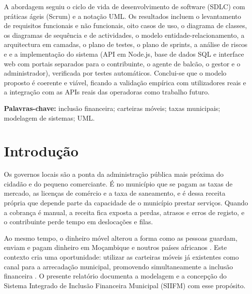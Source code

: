 \documentclass[12pt,a4paper,openany]{report}
\begin{document}
A abordagem seguiu o ciclo de vida de desenvolvimento de software (SDLC) com práticas ágeis (Scrum) e a notação UML. Os resultados incluem o levantamento de requisitos funcionais e não funcionais, oito casos de uso, o diagrama de classes, os diagramas de sequência e de actividades, o modelo entidade-relacionamento, a arquitectura em camadas, o plano de testes, o plano de sprints, a análise de riscos e e a implementação do sistema (API em Node.js, base de dados SQL e interface web com portais separados para o contribuinte, o agente de balcão, o gestor e o administrador), verificada por testes automáticos. Conclui-se que o modelo proposto é coerente e viável, ficando a validação empírica com utilizadores reais e a integração com as APIs reais das operadoras como trabalho futuro.

\vspace{6pt}\noindent\textbf{Palavras-chave:} inclusão financeira; carteiras móveis; taxas municipais; modelagem de sistemas; UML.

\cleardoublepage\clearpage
\renewcommand{\listfigurename}{Lista de Figuras}
\renewcommand{\listtablename}{Lista de Tabelas}
\renewcommand{\contentsname}{Sumário}
\begingroup
\titleformat{\chapter}[hang]{\fontsize{14}{17}\selectfont\bfseries}{}{0pt}{\MakeUppercase}
\listoffigures
{}
\clearpage
\listoftables
{}
\clearpage
\tableofcontents
\endgroup

\clearpage
{}

\chapter{Introdução}
Os governos locais são a ponta da administração pública mais próxima do cidadão e do pequeno comerciante. É no município que se pagam as taxas de mercado, as licenças de comércio e a taxa de saneamento, e é dessa receita própria que depende parte da capacidade de o município prestar serviços. Quando a cobrança é manual, a receita fica exposta a perdas, atrasos e erros de registo, e o contribuinte perde tempo em deslocações e filas.

Ao mesmo tempo, o dinheiro móvel alterou a forma como as pessoas guardam, enviam e pagam dinheiro em Moçambique e noutros países africanos \cite{jack2011,findex2021}. Este contexto cria uma oportunidade: utilizar as carteiras móveis já existentes como canal para a arrecadação municipal, promovendo simultaneamente a inclusão financeira \cite{enif}. O presente relatório documenta a modelagem e a concepção do Sistema Integrado de Inclusão Financeira Municipal (SIIFM) com esse propósito.
\end{document}
